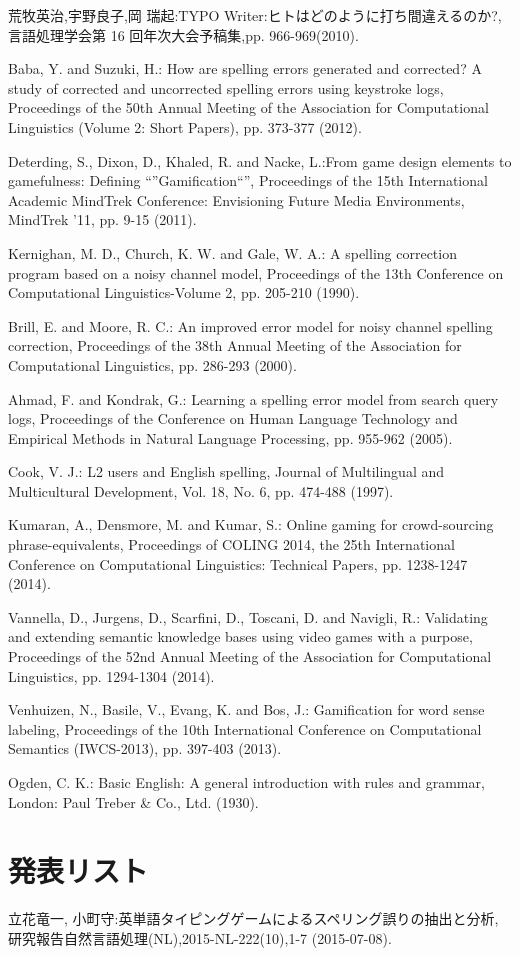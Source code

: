  \begin{thebibliography}{99}
	 荒牧英治,宇野良子,岡 瑞起:TYPO Writer:ヒトはどのように打ち間違えるのか?,言語処理学会第 16 回年次大会予稿集,pp. 966-969(2010).
	
	 Baba, Y. and Suzuki, H.: How are spelling errors generated and corrected? A study of corrected and uncorrected spelling errors using keystroke logs, Proceedings of the 50th Annual Meeting of the Association for Computational Linguistics (Volume 2: Short Papers), pp. 373-377 (2012).

	 Deterding, S., Dixon, D., Khaled, R. and Nacke, L.:From game design elements to gamefulness: Defining “”Gamification“”, Proceedings of the 15th International Academic MindTrek Conference: Envisioning Future Media Environments, MindTrek ’11, pp. 9-15 (2011).

	 Kernighan, M. D., Church, K. W. and Gale, W. A.: A spelling correction program based on a noisy channel model, Proceedings of the 13th Conference on Computational Linguistics-Volume 2, pp. 205-210 (1990).

	 Brill, E. and Moore, R. C.: An improved error model for noisy channel spelling correction, Proceedings of the 38th Annual Meeting of the Association for Computational Linguistics, pp. 286-293 (2000).

	 Ahmad, F. and Kondrak, G.: Learning a spelling error model from search query logs, Proceedings of the Conference on Human Language Technology and Empirical Methods in Natural Language Processing, pp. 955-962 (2005).

	 Cook, V. J.: L2 users and English spelling, Journal of Multilingual and Multicultural Development, Vol. 18, No. 6, pp. 474-488 (1997).

	 Kumaran, A., Densmore, M. and Kumar, S.: Online gaming for crowd-sourcing phrase-equivalents, Proceedings of COLING 2014, the 25th International Conference on Computational Linguistics: Technical Papers, pp. 1238-1247 (2014).

	 Vannella, D., Jurgens, D., Scarfini, D., Toscani, D. and Navigli, R.: Validating and extending semantic knowledge bases using video games with a purpose, Proceedings of the 52nd Annual Meeting of the Association for Computational Linguistics, pp. 1294-1304 (2014).

	 Venhuizen, N., Basile, V., Evang, K. and Bos, J.: Gamification for word sense labeling, Proceedings of the 10th International Conference on Computational Semantics (IWCS-2013), pp. 397-403 (2013).

	 Ogden, C. K.: Basic English: A general introduction with rules and grammar, London: Paul Treber \& Co., Ltd. (1930).


 \end{thebibliography}


 \newpage

 \section*{\Large 発表リスト}
 \noindent [NL222] 立花竜一, 小町守:英単語タイピングゲームによるスペリング誤りの抽出と分析, 研究報告自然言語処理(NL),2015-NL-222(10),1-7 (2015-07-08).